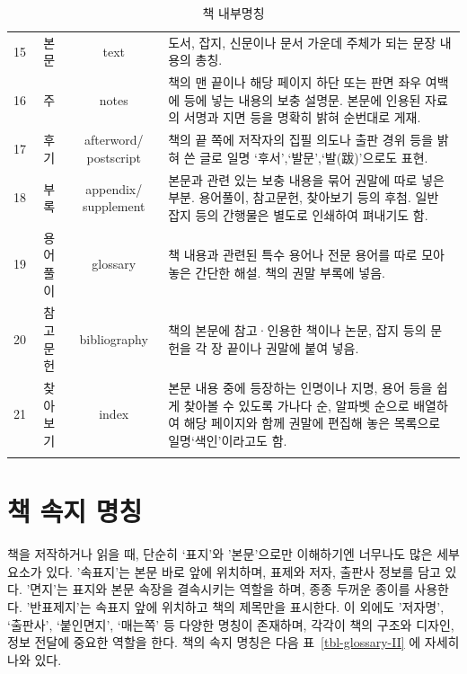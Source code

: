 \documentclass[
  letterpaper,
]{book}
\begin{document}
\begin{longtable}{cccl}
15 & 본문 & text & 도서, 잡지, 신문이나 문서 가운데 주체가 되는 문장 내용의 총칭. \\ 
16 & 주 & notes & 책의 맨 끝이나 해당 페이지 하단 또는 판면 좌우 여백에 등에 넣는 내용의 보충 설명문. 본문에 인용된 자료의 서명과 지면 등을 명확히 밝혀 순번대로 게재. \\ 
17 & 후기 & afterword/ postscript & 책의 끝 쪽에 저작자의 집필 의도나 출판 경위 등을 밝혀 쓴 글로 일명 ‘후서’,‘발문’,‘발(跋)’으로도 표현. \\ 
18 & 부록 & appendix/ supplement & 본문과 관련 있는 보충 내용을 묶어 권말에 따로 넣은 부분. 용어풀이, 참고문헌, 찾아보기 등의 후첨. 일반 잡지 등의 간행물은 별도로 인쇄하여 펴내기도 함. \\ 
19 & 용어풀이 & glossary & 책 내용과 관련된 특수 용어나 전문 용어를 따로 모아 놓은 간단한 해설. 책의 권말 부록에 넣음. \\ 
20 & 참고문헌 & bibliography & 책의 본문에 참고·인용한 책이나 논문, 잡지 등의 문헌을 각 장 끝이나 권말에 붙여 넣음. \\ 
21 & 찾아보기 & index & 본문 내용 중에 등장하는 인명이나 지명, 용어 등을 쉽게 찾아볼 수 있도록 가나다 순, 알파벳 순으로 배열하여 해당 페이지와 함께 권말에 편집해 놓은 목록으로 일명‘색인’이라고도 함. \\ 
\bottomrule
\caption{\label{tbl-glossary}책 내부명칭 }\tabularnewline
\end{longtable}

\hypertarget{book-outer-II}{%
\section{책 속지 명칭}\label{book-outer-II}}

책을 저작하거나 읽을 때, 단순히 `표지'와 '본문'으로만 이해하기엔
너무나도 많은 세부 요소가 있다. '속표지'는 본문 바로 앞에 위치하며,
표제와 저자, 출판사 정보를 담고 있다. '면지'는 표지와 본문 속장을
결속시키는 역할을 하며, 종종 두꺼운 종이를 사용한다. '반표제지'는 속표지
앞에 위치하고 책의 제목만을 표시한다. 이 외에도 '저자명', `출판사',
`붙인면지', `매는쪽' 등 다양한 명칭이 존재하며, 각각이 책의 구조와
디자인, 정보 전달에 중요한 역할을 한다. 책의 속지 명칭은 다음
표~\ref{tbl-glossary-II} 에 자세히 나와 있다.
\end{document}
